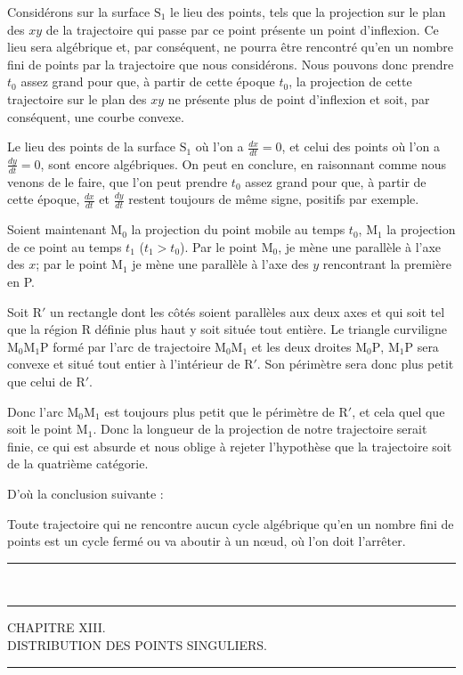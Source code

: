 \documentclass[11pt]{article}
\newcommand{\ornament}{\begin{center}\rule{2.5em}{0.4pt}\,\raisebox{0.1ex}{\tiny$\bullet\bullet\bullet$}\,\rule{2.5em}{0.4pt}\end{center}}
\newcommand{\shortline}{\begin{center}\rule{3.5em}{0.4pt}\end{center}}
\begin{document}
Considérons sur la surface $\mathrm{S}_1$ le lieu des points, tels que la projection sur le plan des $xy$ de la trajectoire qui passe par ce point présente un point d’inflexion. Ce lieu sera algébrique et, par conséquent, ne pourra être rencontré qu’en un nombre fini de points par la trajectoire que nous considérons. Nous pouvons donc prendre $t_0$ assez grand pour que, à partir de cette époque $t_0$, la projection de cette trajectoire sur le plan des $xy$ ne présente plus de point d’inflexion et soit, par conséquent, une courbe convexe.

Le lieu des points de la surface $\mathrm{S}_1$ où l’on a $\frac{dx}{dt}=0$, et celui des points où l’on a $\frac{dy}{dt}=0$, sont encore algébriques. On peut en conclure, en raisonnant comme nous venons de le faire, que l’on peut prendre $t_0$ assez grand pour que, à partir de cette époque, $\frac{dx}{dt}$ et $\frac{dy}{dt}$ restent toujours de même signe, positifs par exemple.

Soient maintenant $\mathrm{M}_0$ la projection du point mobile au temps $t_0$, $\mathrm{M}_1$ la projection de ce point au temps $t_1$ ($t_1>t_0$). Par le point $\mathrm{M}_0$, je mène une parallèle à l’axe des $x$; par le point $\mathrm{M}_1$ je mène une parallèle à l’axe des $y$ rencontrant la première en P.

Soit R$'$ un rectangle dont les côtés soient parallèles aux deux axes et qui soit tel que la région R définie plus haut y soit située tout entière. Le triangle curviligne $\mathrm{M}_0\mathrm{M}_1\mathrm{P}$ formé par l’arc de trajectoire $\mathrm{M}_0\mathrm{M}_1$ et les deux droites $\mathrm{M}_0\mathrm{P}$, $\mathrm{M}_1\mathrm{P}$ sera convexe et situé tout entier à l’intérieur de R$'$. Son périmètre sera donc plus petit que celui de R$'$.

Donc l’arc $\mathrm{M}_0\mathrm{M}_1$ est toujours plus petit que le périmètre de R$'$, et cela quel que soit le point $\mathrm{M}_1$. Donc la longueur de la projection de notre trajectoire serait finie, ce qui est absurde et nous oblige à rejeter l’hypothèse que la trajectoire soit de la quatrième catégorie.

D’où la conclusion suivante :

Toute trajectoire qui ne rencontre aucun cycle algébrique qu’en un nombre fini de points est un cycle fermé ou va aboutir à un nœud, où l’on doit l’arrêter.

\ornament

\begin{center}
{\large CHAPITRE XIII.}\\[0.4em]
{\small DISTRIBUTION DES POINTS SINGULIERS.}
\end{center}
\shortline
\end{document}
